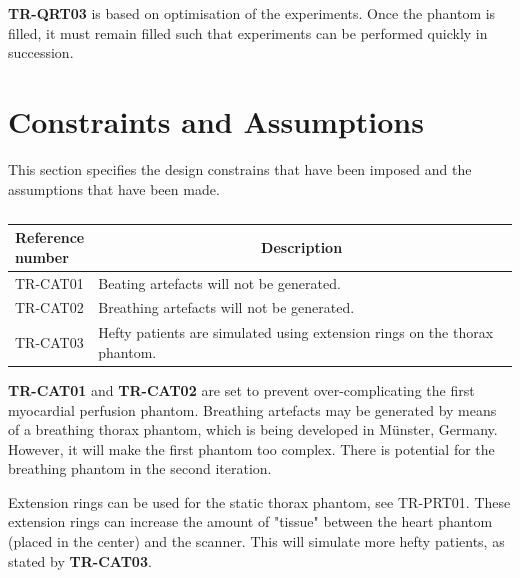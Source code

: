 \textbf{TR-QRT03} is based on optimisation of the experiments. Once the phantom is filled, it must remain filled such that experiments can be performed quickly in succession. 

\section{Constraints and Assumptions}
This section specifies the design constrains that have been imposed and the assumptions that have been made.

\begin{table}[H]
\caption{}
\label{tab:constassump}
\begin{tabular}{l|p{120mm}|}
	\makecell[l]{\textbf{Reference} \\ \textbf{number}} & \multicolumn{1}{c}{\textbf{Description}}\\
	\hline
	TR-CAT01 & Beating artefacts will not be generated. \\
	TR-CAT02 & Breathing artefacts will not be generated. \\
	TR-CAT03 & Hefty patients are simulated using extension rings on the thorax phantom.  \\
	\cline{2-2}
\end{tabular}
\end{table}

\textbf{TR-CAT01} and \textbf{TR-CAT02} are set to prevent over-complicating the first myocardial perfusion phantom. Breathing artefacts may be generated by means of a breathing thorax phantom, which is being developed in Münster, Germany. However, it will make the first phantom too complex. There is potential for the breathing phantom in the second iteration.

Extension rings can be used for the static thorax phantom, see TR-PRT01. These extension rings can increase the amount of "tissue" between the heart phantom (placed in the center) and the scanner. This will simulate more hefty patients, as stated by \textbf{TR-CAT03}.
